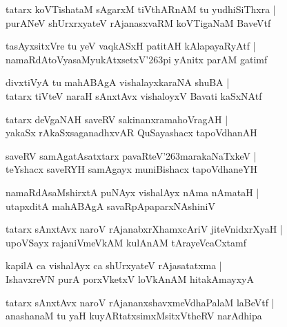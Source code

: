 \documentclass[twoside,12pt,openright]{book}
\def\S{\char'263}
\newcounter{shloka}[chapter]
\begin{document}
\begin{shloka}
tatarx koVTishataM sAgarxM tiVthARnAM tu yudhiSiThxra |\\
purANeV shUrxrxyateV rAjanasxvaRM koVTigaNaM BaveVtf 
\end{shloka}

\begin{shloka}
tasAyxsitxVre tu yeV vaqkASxH patitAH kAlapayaRyAtf |\\
namaRdAtoVyasaMyukAtxsetxV\S pi yAnitx parAM gatimf
\end{shloka}

\begin{shloka}
divxtiVyA tu mahABAgA vishalayxkaraNA shuBA |\\
tatarx tiVteV naraH sAnxtAvx vishaloyxV Bavati kaSxNAtf
\end{shloka}

\begin{shloka}
tatarx deVgaNAH saveRV sakinanxramahoVragAH |\\
yakaSx rAkaSxsaganadhxvAR QuSayashacx tapoVdhanAH
\end{shloka}

\begin{shloka}
saveRV samAgatAsatxtarx pavaRteV\S marakaNaTxkeV |\\
teYshacx saveRYH samAgayx muniBishacx tapoVdhaneYH 
\end{shloka}

\begin{shloka}
namaRdAsaMshirxtA puNAyx vishalAyx nAma nAmataH |\\
utapxditA mahABAgA savaRpApaparxNAshiniV 
\end{shloka}

\begin{shloka}
tatarx sAnxtAvx naroV rAjanabxrXhamxcAriV jiteVnidxrXyaH |\\
upoVSayx rajaniVmeVkAM kulAnAM tArayeVcaCxtamf
\end{shloka}

\begin{shloka}
kapilA ca vishalAyx ca shUrxyateV rAjasatatxma |\\
IshavxreVN purA porxVketxV loVkAnAM hitakAmayxyA 
\end{shloka}

\begin{shloka}
tatarx sAnxtAvx naroV rAjananxshavxmeVdhaPalaM laBeVtf |\\
anashanaM tu yaH kuyARtatxsimxMsitxVtheRV narAdhipa
\end{shloka}
\end{document}
